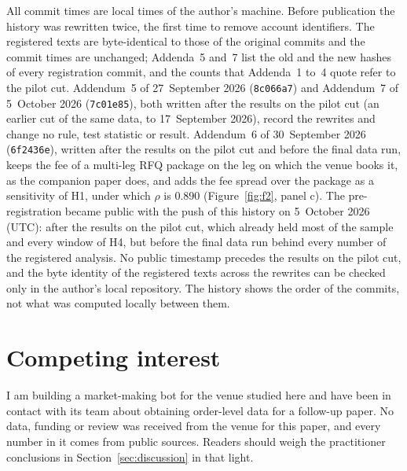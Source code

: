 \documentclass[a4paper,fleqn]{cas-dc}
\begin{document}
All commit times are local times of the author's machine. Before publication the history was rewritten twice, the first
time to remove account identifiers. The registered texts are byte-identical to those of the original commits and the commit
times are unchanged; Addenda~5 and~7 list the old and the new hashes of every registration commit, and the counts that
Addenda~1 to~4 quote refer to the pilot cut.
Addendum~5 of 27~September 2026 (\texttt{8c066a7}) and Addendum~7 of 5~October 2026 (\texttt{7c01e85}), both
written after the results on the pilot cut (an earlier cut of the same data, to 17~September 2026), record the rewrites and change no rule, test statistic or result. Addendum~6 of
30~September 2026 (\texttt{6f2436e}), written after the results on
the pilot cut and before the final data run, keeps the fee of a multi-leg RFQ package on the leg on which the
venue books it, as the companion paper does, and adds the fee spread over the package as a sensitivity of H1,
under which $\rho$ is 0.890 (Figure~\ref{fig:f2}, panel c). The pre-registration became public with the push of
this history on 5~October 2026 (UTC): after the results on the pilot cut, which already held most of the
sample and every window of H4, but before the final data run behind every number of the registered analysis.
No public timestamp precedes the results on the pilot cut, and the byte identity of the registered texts
across the rewrites can be checked only in the author's local repository. The history shows the order
of the commits, not what was computed locally between them.

\section*{Competing interest}
I am building a market-making bot for the venue studied here and have been in contact with its team about
obtaining order-level data for a follow-up paper. No data, funding or review was received from the venue for
this paper, and every number in it comes from public sources. Readers should weigh the practitioner
conclusions in Section~\ref{sec:discussion} in that light.
\end{document}
